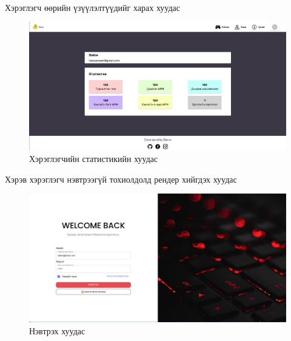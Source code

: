 Хэрэглэгч өөрийн үзүүлэлтүүдийг харах хуудас
\begin{figure}[h]
	\centering
	\includegraphics[width=13cm]{images/result/statisticspage.png}
	\caption{Хэрэглэгчийн статистикийн хуудас}
	\label{fig:results}
\end{figure}

\clearpage
Хэрэв хэрэглэгч нэвтрээгүй тохиолдолд рендер хийгдэх хуудас
\begin{figure}[h]
	\centering
	\includegraphics[width=13cm]{images/result/loginpage.png}
	\caption{Нэвтрэх хуудас}
	\label{fig:results}
\end{figure}